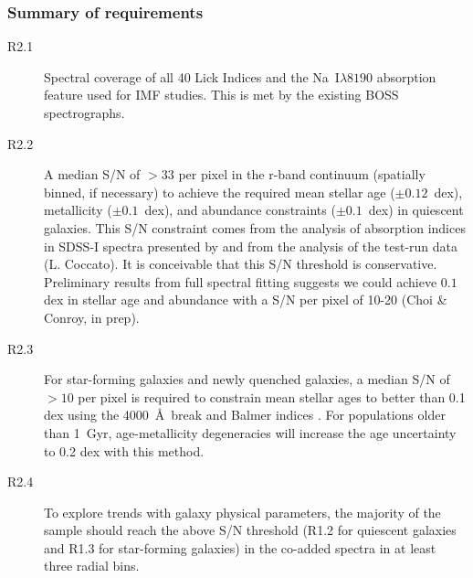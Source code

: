 \documentclass[preprint,11pt]{aastex}
\begin{document}
\subsubsection{Summary of requirements}

\begin{description} 

\item[R2.1] Spectral coverage of all 40 Lick Indices and the
   Na~I$\lambda8190$ absorption feature used for IMF studies.  
   This is met by the existing BOSS spectrographs.

 \item[R2.2] A median S/N of $>33$ per pixel in the r-band continuum
   (spatially binned, if necessary) to achieve the required mean
   stellar age ($\pm0.12$~dex), metallicity ($\pm0.1$~dex), and
   abundance constraints ($\pm0.1$~dex) in quiescent galaxies. This
   S/N constraint comes from the analysis of absorption indices in
   SDSS-I spectra presented by \cite{johansson12} and from the
   analysis of the test-run data (L. Coccato).  It is conceivable that
   this S/N threshold is conservative. Preliminary results from full
   spectral fitting suggests we could achieve $0.1$ dex in stellar age
   and abundance with a S/N per pixel of 10-20 (Choi \& Conroy, in
   prep).
   

 \item[R2.3] For star-forming galaxies and newly quenched galaxies, a
   median S/N of $>10$ per pixel is required to constrain mean stellar
   ages to better than 0.1 dex using the 4000~\AA\ break and Balmer
   indices \citep{kauffmann03a}.  For populations older than 1~Gyr,
   age-metallicity degeneracies will increase the age uncertainty to 0.2
   dex with this method.


 \item[R2.4] To explore trends with galaxy physical parameters, the
   majority of the sample should reach the above S/N threshold (R1.2
   for quiescent galaxies and R1.3 for star-forming galaxies) in the
   co-added spectra in at least three radial bins.



\end{description}
\end{document}
